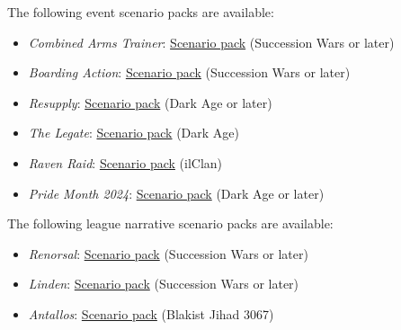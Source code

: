 The following event scenario packs are available:

\begin{itemize}

\item \emph{Combined Arms Trainer}: \href{https://raw.githubusercontent.com/Eudicods/outworlds-wastes/rules-pdf/combined-arms-trainer.pdf}{Scenario pack} (Succession Wars or later)

\item \emph{Boarding Action}: \href{https://raw.githubusercontent.com/Eudicods/outworlds-wastes/rules-pdf/boarding-action.pdf}{Scenario pack} (Succession Wars or later)

\item \emph{Resupply}: \href{https://raw.githubusercontent.com/Eudicods/outworlds-wastes/rules-pdf/resupply.pdf}{Scenario pack} (Dark Age or later)

\item \emph{The Legate}: \href{https://raw.githubusercontent.com/Eudicods/outworlds-wastes/rules-pdf/the-legate.pdf}{Scenario pack} (Dark Age)

\item \emph{Raven Raid}: \href{https://raw.githubusercontent.com/Eudicods/outworlds-wastes/rules-pdf/raven-raid.pdf}{Scenario pack} (ilClan)

\item \emph{Pride Month 2024}: \href{https://raw.githubusercontent.com/Eudicods/outworlds-wastes/rules-pdf/pride-2024.pdf}{Scenario pack} (Dark Age or later)

\end{itemize}

The following league narrative scenario packs are available:

\begin{itemize}

\item \emph{Renorsal}: \href{https://raw.githubusercontent.com/Eudicods/outworlds-wastes/rules-pdf/renorsal.pdf}{Scenario pack} (Succession Wars or later)

\item \emph{Linden}: \href{https://raw.githubusercontent.com/Eudicods/outworlds-wastes/rules-pdf/linden.pdf}{Scenario pack} (Succession Wars or later)

\item \emph{Antallos}: \href{https://raw.githubusercontent.com/Eudicods/outworlds-wastes/rules-pdf/antallos.pdf}{Scenario pack} (Blakist Jihad 3067)

\end{itemize}


